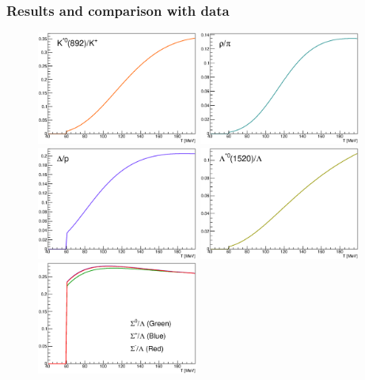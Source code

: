 \subsubsection{Results and comparison with data}
\begin{figure}[!htbp]
\begin{center}
        \includegraphics[width=200px]{./Version1/FigChapter2/KStarToK}
       \includegraphics[width=200px]{./Version1/FigChapter2/RhoToPion}
        \includegraphics[width=200px]{./Version1/FigChapter2/DeltaToProton}
		\includegraphics[width=200px]{./Version1/FigChapter2/LambdaStarToLambda}
		\includegraphics[width=200px]{./Version1/FigChapter2/SigmaRatio}

\end{center}
\end{figure}
